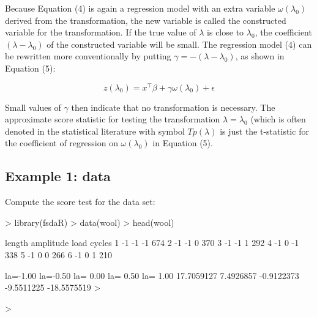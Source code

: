 \documentclass[article,shortnames,nojss]{jss}
\begin{document}
Because Equation (4) is again a regression model with an extra variable $\omega(\lambda_0)$ derived from the transformation, the new variable is called the constructed variable for the transformation. If the true value of $\lambda$ is close to $\lambda_0$, the coefficient $(\lambda-\lambda_0)$ of the constructed variable will be small. The regression model (4) can be rewritten more conventionally by putting $\gamma=-(\lambda-\lambda_0)$, as shown in Equation (5):

\begin{equation}
\label{eq:5}
  z(\lambda_0) = x^\top \beta + \gamma \omega(\lambda_0) + \epsilon
  \tag{5}
\end{equation}

Small values of $\gamma$ then indicate that no transformation is necessary. The approximate score statistic for testing the transformation $\lambda=\lambda_0$ (which is often denoted in the statistical literature with symbol $Tp(\lambda)$ is just the t-statistic for the coefficient of regression on $\omega(\lambda_0)$ in Equation (5).

\subsection[Example 1: wool data]{Example 1:  data}

Compute the score test for the  data set:


\begin{Schunk}
\begin{Sinput}
> library(fsdaR)
> data(wool)
> head(wool)
\end{Sinput}
\begin{Soutput}
  length amplitude load cycles
1     -1        -1   -1    674
2     -1        -1    0    370
3     -1        -1    1    292
4     -1         0   -1    338
5     -1         0    0    266
6     -1         0    1    210
\end{Soutput}
\begin{Soutput}
   la=-1.00    la=-0.50    la= 0.00    la= 0.50    la= 1.00
 17.7059127   7.4926857  -0.9122373  -9.5511225 -18.5575519
>\end{Soutput}
\begin{Sinput}
>
\end{Sinput}
\end{Schunk}
\end{document}
